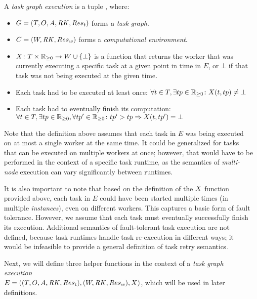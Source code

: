 \vspace{2mm} A \emph{task graph execution}
is a tuple \taskgraphexecution, where:
\begin{itemize}[itemsep=0pt]
	\item $G = (T, O, A, \mathit{RK}, Res_t)$ forms a \emph{task graph}.
	\item $C = (W, \mathit{RK}, Res_w)$ forms a \emph{computational environment}.
	\item $X\colon T \times \mathbb{R}_{\geq{}0} \rightarrow W \cup \{\bot\}$ is a
	function that returns the worker that was currently
	      executing a specific task at a given point in time in $E$, or $\bot$ if that task was not
	      being executed at the given time.
	\item Each task had to be executed at
	least once: $\forall t\in{}T, \exists tp\in\mathbb{R}_{\geq{}0}\colon X(t, tp) \neq \bot$
	\item Each task had to eventually finish its computation: \vspace{1mm}\\
	$\forall t\in{}T, \exists tp\in\mathbb{R}_{\geq{}0}, \forall tp'\in\mathbb{R}_{\geq{}0}\colon tp' > tp \Rightarrow X(t, tp') = \bot$
\end{itemize}

Note that the definition above assumes that each task in $E$ was being executed on at most a
single worker at the same time. It could be generalized for tasks that can be executed on multiple
workers at once; however, that would have to be performed in the context of a specific task runtime,
as the semantics of \emph{multi-node} execution can vary significantly between runtimes.

It is also important to note that based on the definition of the $X$
function provided above, each task in $E$ could have been started multiple times (in multiple
\emph{instances}), even on different workers. This captures a basic form of fault tolerance.
However, we assume that each task must eventually successfully finish its execution. Additional
semantics of fault-tolerant task execution are not defined, because task runtimes handle task
re-execution in different ways; it would be infeasible to provide a general definition of task
retry semantics.

Next, we will define three helper functions in the context of a \emph{task graph execution} \\
$E = ((T, O, A, \mathit{RK}, Res_t), (W, \mathit{RK}, Res_w), X)$, which will be
used in later definitions.

